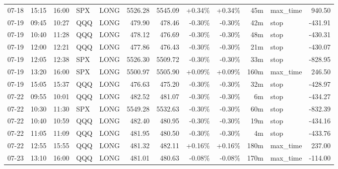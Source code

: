 \documentclass[11pt,a4paper,twoside]{article}
\begin{document}
\begin{center}
\begin{longtable}{>{\color{txtmain}}l l l l l r r r r r >{\color{txtmain}}l r}
07-18 & 15:15 & 16:00 & SPX & LONG & 5526.28 & 5545.09 & \textcolor{wingreen}{+0.34\%} & \textcolor{wingreen}{+0.34\%} & 45m & max\_time & \textcolor{wingreen}{940.50} \\
07-19 & 09:45 & 10:27 & QQQ & LONG & 479.90 & 478.46 & \textcolor{lossred}{-0.30\%} & \textcolor{lossred}{-0.30\%} & 42m & stop & \textcolor{lossred}{-431.91} \\
07-19 & 10:40 & 11:28 & QQQ & LONG & 478.12 & 476.69 & \textcolor{lossred}{-0.30\%} & \textcolor{lossred}{-0.30\%} & 48m & stop & \textcolor{lossred}{-430.31} \\
07-19 & 12:00 & 12:21 & QQQ & LONG & 477.86 & 476.43 & \textcolor{lossred}{-0.30\%} & \textcolor{lossred}{-0.30\%} & 21m & stop & \textcolor{lossred}{-430.07} \\
07-19 & 12:05 & 12:38 & SPX & LONG & 5526.30 & 5509.72 & \textcolor{lossred}{-0.30\%} & \textcolor{lossred}{-0.30\%} & 33m & stop & \textcolor{lossred}{-828.95} \\
07-19 & 13:20 & 16:00 & SPX & LONG & 5500.97 & 5505.90 & \textcolor{wingreen}{+0.09\%} & \textcolor{wingreen}{+0.09\%} & 160m & max\_time & \textcolor{wingreen}{246.50} \\
07-19 & 15:05 & 15:37 & QQQ & LONG & 476.63 & 475.20 & \textcolor{lossred}{-0.30\%} & \textcolor{lossred}{-0.30\%} & 32m & stop & \textcolor{lossred}{-428.97} \\
07-22 & 09:55 & 10:01 & QQQ & LONG & 482.52 & 481.07 & \textcolor{lossred}{-0.30\%} & \textcolor{lossred}{-0.30\%} & 6m & stop & \textcolor{lossred}{-434.27} \\
07-22 & 10:30 & 11:30 & SPX & LONG & 5549.28 & 5532.63 & \textcolor{lossred}{-0.30\%} & \textcolor{lossred}{-0.30\%} & 60m & stop & \textcolor{lossred}{-832.39} \\
07-22 & 10:40 & 10:59 & QQQ & LONG & 482.40 & 480.95 & \textcolor{lossred}{-0.30\%} & \textcolor{lossred}{-0.30\%} & 19m & stop & \textcolor{lossred}{-434.16} \\
07-22 & 11:05 & 11:09 & QQQ & LONG & 481.95 & 480.50 & \textcolor{lossred}{-0.30\%} & \textcolor{lossred}{-0.30\%} & 4m & stop & \textcolor{lossred}{-433.76} \\
07-22 & 12:55 & 15:55 & QQQ & LONG & 481.32 & 482.11 & \textcolor{wingreen}{+0.16\%} & \textcolor{wingreen}{+0.16\%} & 180m & max\_time & \textcolor{wingreen}{237.00} \\
07-23 & 13:10 & 16:00 & QQQ & LONG & 481.01 & 480.63 & \textcolor{lossred}{-0.08\%} & \textcolor{lossred}{-0.08\%} & 170m & max\_time & \textcolor{lossred}{-114.00} \\

\end{longtable}
\end{center}
\end{document}

